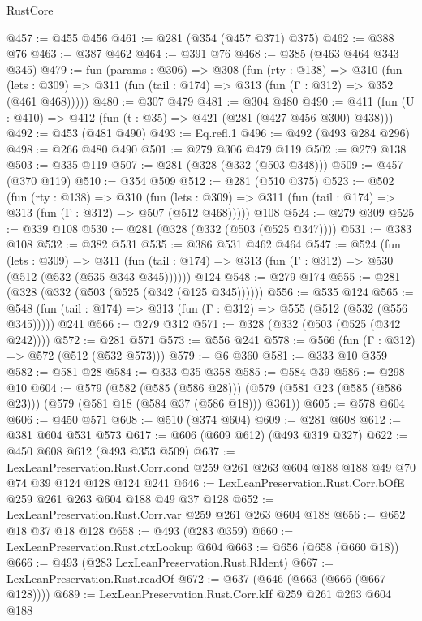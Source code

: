 \begin{lexlean}{RustCore}
\begin{coremodule}
@457 := @455 @456
@461 := @281 (@354 (@457 @371) @375)
@462 := @388 @76
@463 := @387 @462
@464 := @391 @76
@468 := @385 (@463 @464 @343 @345)
@479 := fun (params : @306) =>
  @308
    (fun (rty : @138) =>
    @310
      (fun (lets : @309) => @311 (fun (tail : @174) => @313 (fun (Γ : @312) => @352 (@461 @468)))))
@480 := @307 @479
@481 := @304 @480
@490 := @411 (fun (U : @410) => @412 (fun (t : @35) => @421 (@281 (@427 @456 @300) @438)))
@492 := @453 (@481 @490)
@493 := Eq.refl.{1}
@496 := @492 (@493 @284 @296)
@498 := @266 @480 @490
@501 := @279 @306 @479 @119
@502 := @279 @138
@503 := @335 @119
@507 := @281 (@328 (@332 (@503 @348)))
@509 := @457 (@370 @119)
@510 := @354 @509
@512 := @281 (@510 @375)
@523 := @502
    (fun (rty : @138) =>
    @310
      (fun (lets : @309) => @311 (fun (tail : @174) => @313 (fun (Γ : @312) => @507 (@512 @468)))))
    @108
@524 := @279 @309
@525 := @339 @108
@530 := @281 (@328 (@332 (@503 (@525 @347))))
@531 := @383 @108
@532 := @382 @531
@535 := @386 @531 @462 @464
@547 := @524
    (fun (lets : @309) =>
    @311 (fun (tail : @174) => @313 (fun (Γ : @312) => @530 (@512 (@532 (@535 @343 @345))))))
    @124
@548 := @279 @174
@555 := @281 (@328 (@332 (@503 (@525 (@342 (@125 @345))))))
@556 := @535 @124
@565 := @548 (fun (tail : @174) => @313 (fun (Γ : @312) => @555 (@512 (@532 (@556 @345))))) @241
@566 := @279 @312
@571 := @328 (@332 (@503 (@525 (@342 @242))))
@572 := @281 @571
@573 := @556 @241
@578 := @566 (fun (Γ : @312) => @572 (@512 (@532 @573)))
@579 := @6 @360
@581 := @333 @10 @359
@582 := @581 @28
@584 := @333 @35 @358
@585 := @584 @39
@586 := @298 @10
@604 := @579
    (@582 (@585 (@586 @28)))
    (@579 (@581 @23 (@585 (@586 @23))) (@579 (@581 @18 (@584 @37 (@586 @18))) @361))
@605 := @578 @604
@606 := @450 @571
@608 := @510 (@374 @604)
@609 := @281 @608
@612 := @381 @604 @531 @573
@617 := @606 (@609 @612) (@493 @319 @327)
@622 := @450 @608 @612 (@493 @353 @509)
@637 := LexLeanPreservation.Rust.Corr.cond
    @259
    @261
    @263
    @604
    @188
    @188
    @49
    @70
    @74
    @39
    @124
    @128
    @124
    @241
@646 := LexLeanPreservation.Rust.Corr.bOfE @259 @261 @263 @604 @188 @49 @37 @128
@652 := LexLeanPreservation.Rust.Corr.var @259 @261 @263 @604 @188
@656 := @652 @18 @37 @18 @128
@658 := @493 (@283 @359)
@660 := LexLeanPreservation.Rust.ctxLookup @604
@663 := @656 (@658 (@660 @18))
@666 := @493 (@283 LexLeanPreservation.Rust.RIdent)
@667 := LexLeanPreservation.Rust.readOf
@672 := @637 (@646 (@663 (@666 (@667 @128))))
@689 := LexLeanPreservation.Rust.Corr.kIf
    @259
    @261
    @263
    @604
    @188

\end{coremodule}
\end{lexlean}

